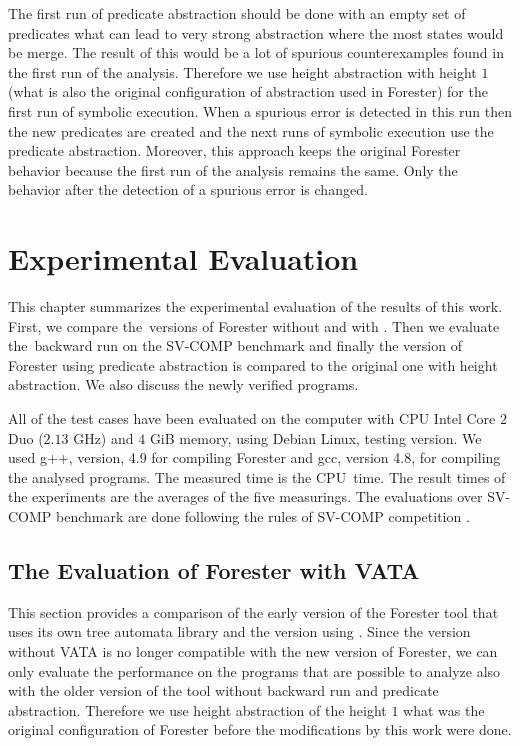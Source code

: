 The first run of predicate abstraction should be done
with an empty set of predicates what can lead to very
strong abstraction where the most states would be merge.
The result of this would be a lot of spurious counterexamples found
in the first run of the analysis.
Therefore we use height abstraction with height $1$ (what is
also the original configuration of abstraction used in Forester)
for the first run of symbolic execution.
When a spurious error is detected in this run then the new
predicates are created and the next runs of symbolic execution use the predicate abstraction.
Moreover, this approach keeps the original Forester behavior
because the first run of the analysis remains the same.
Only the behavior after the detection of a spurious error is changed.


\chapter{Experimental Evaluation}
\label{ch:eval}

This chapter summarizes the experimental evaluation of the results of this work.
First, we compare the~versions of Forester without and with \vata.
Then we evaluate the~backward run on the SV-COMP benchmark
and finally the version of Forester using predicate abstraction is compared to the
original one with height abstraction.
We also discuss the newly verified programs.

All of the test cases have been evaluated on the computer with CPU Intel Core $2$ Duo ($2.13$ GHz)
and $4$ GiB memory, using Debian Linux, testing version.
We used g++, version, 4.9 for compiling Forester and gcc, version 4.8,
for compiling the analysed programs.
The measured time is the CPU~time.
The result times of the experiments are the averages of the five measurings.
The evaluations over SV-COMP benchmark are done following the rules of
SV-COMP competition \cite{www:svcomp}.

\section{The Evaluation of Forester with VATA}

This section provides a comparison of the early version of the Forester tool
that uses its own tree automata library and the version using \vata.
Since the version without VATA is no longer compatible with the
new version of Forester, we can only evaluate the performance
on the programs that are possible to analyze also with the older
version of the tool without backward run and predicate abstraction.
Therefore we use height abstraction of the height $1$
what was the original configuration of Forester before the
modifications by this work were done.

